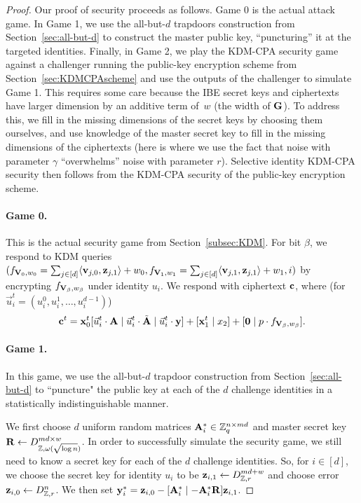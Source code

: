 \begin{proof}
  Our proof of security proceeds as follows. Game 0 is the actual
  attack game. In Game 1, we use the all-but-$d$ trapdoors
  construction from Section~\ref{sec:all-but-d} to construct the
  master public key, ``puncturing'' it at the targeted identities.
  Finally, in Game 2, we play the KDM-CPA security game against a
  challenger running the public-key encryption scheme from
  Section~\ref{sec:KDMCPAscheme} and use the outputs of the challenger
  to simulate Game 1. This requires some care because the IBE secret
  keys and ciphertexts have larger dimension by an additive term
  of~$w$ (the width of $\mathbf{G}$).  To address this, we fill in the
  missing dimensions of the secret keys by choosing them ourselves,
  and use knowledge of the master secret key to fill in the missing
  dimensions of the ciphertexts (here is where we use the fact that
  noise with parameter $\gamma$ ``overwhelms'' noise with parameter
  $r$).  Selective identity KDM-CPA security then follows from the
  KDM-CPA security of the public-key encryption scheme.
  
  \paragraph{Game 0.} This is the actual security game from
  Section~\ref{subsec:KDM}. For bit $\beta$, we respond to KDM queries
  $(f_{\mathbf{V}_0, w_0} = \sum_{j \in
    [d]}\langle{\ensuremath{\mathbf{v}}_{j,0},\ensuremath{\mathbf{z}}_{j,1}}\rangle+w_{0}, f_{\mathbf{V}_1, w_1} =
  \sum_{j \in [d]}\langle{\ensuremath{\mathbf{v}}_{j,1}, \ensuremath{\mathbf{z}}_{j,1}}\rangle+w_1, i)$ by
  encrypting $f_{\mathbf{V}_{\beta}, w_{\beta}}$ under identity $u_{i}$. We
  respond with ciphertext $\mathbf{c}$, where (for $\vec{u}_i^t = (u_i^0,
  u_i^1, \ldots, u_i^{d-1})$)
  \[\mathbf{c}^t = \mathbf{x}_0^t[\vec{u}_i^t \cdot \mathbf{A} \mid \vec{u}_i^t \cdot
  \tilde{\mathbf{A}} \mid \vec{u}_i^t \cdot \mathbf{y}]+[\mathbf{x}_1^t \mid x_2] + [\mathbf{0}
  \mid p \cdot f_{\mathbf{V}_{\beta}, w_{\beta}}].\]

  \paragraph{Game 1.} In this game, we use the all-but-$d$ trapdoor
  construction from Section~\ref{sec:all-but-d} to ``puncture" the
  public key at each of the $d$ challenge identities in a
  statistically indistinguishable manner.

  We first choose $d$ uniform random matrices $\mathbf{A}_i^* \in \mathbb{Z}_q^{n
    \times md}$ and master secret key $\mathbf{R} \gets D_{\mathbb{Z},
    \omega(\sqrt{\log{n}})}^{m{d}\times w}$. In order to successfully
  simulate the security game, we still need to know a secret key for
  each of the $d$ challenge identities. So, for $i \in [d]$, we choose
  the secret key for identity $u_i$ to be $\mathbf{z}_{i,1} \gets
  D_{\mathbb{Z},r}^{md+w}$ and choose error $\mathbf{z}_{i,0} \gets
  D_{\mathbb{Z},r}^{n}$. We then set $\mathbf{y}_i^* = \mathbf{z}_{i,0} - [\mathbf{A}_i^*
  \mid -\mathbf{A}_i^*\mathbf{R}]\mathbf{z}_{i,1}$.


\end{proof}
